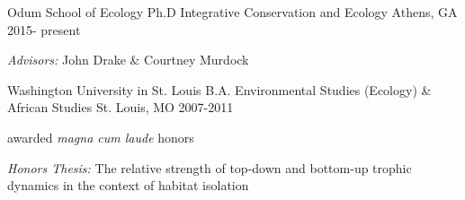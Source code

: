 

\begin{cventries}

  \cventry
  	{Odum School of Ecology} %
    {Ph.D Integrative Conservation and Ecology} %
    {Athens, GA} %
    {2015- present} %
	{
      \begin{cvitems} %
      \item{\textit{Advisors:} John Drake \& Courtney Murdock}
      \end{cvitems}
    }

   \cventry
    {Washington University in St. Louis} %
    {B.A. Environmental Studies (Ecology) \& African Studies} %
    {St. Louis, MO} %
    {2007-2011} %
    {
      \begin{cvitems} %
      	\item {awarded \textit{magna cum laude} honors}
        \item { \textit{Honors Thesis:} The relative strength of top-down and bottom-up trophic dynamics in the context of habitat isolation}
      \end{cvitems}
    }

\end{cventries}
